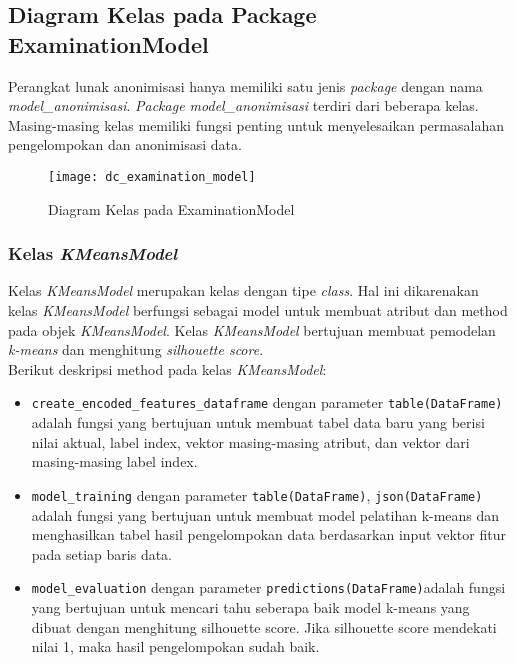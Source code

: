 \subsection{Diagram Kelas pada Package ExaminationModel}

\noindent Perangkat lunak anonimisasi hanya memiliki satu jenis \textit{package} dengan nama \textit{model\_anonimisasi}. \textit{Package model\_anonimisasi} terdiri dari beberapa kelas. Masing-masing kelas memiliki fungsi penting untuk menyelesaikan permasalahan pengelompokan dan anonimisasi data.

\begin{figure}[H]
	\centering
	\texttt{[image: dc\_examination\_model]}
	\caption{Diagram Kelas pada ExaminationModel}
	\label{fig:dc_examination_model}
\end{figure}

\subsubsection{Kelas \textit{KMeansModel}}
Kelas \textit{KMeansModel} merupakan kelas dengan tipe \textit{class}. Hal ini dikarenakan kelas \textit{KMeansModel} berfungsi sebagai model untuk membuat atribut dan method pada objek \textit{KMeansModel}. Kelas \textit{KMeansModel} bertujuan membuat pemodelan \textit{k-means} dan menghitung \textit{silhouette score}.\\

\noindent \noindent Berikut deskripsi method pada kelas \textit{KMeansModel}:

\begin{itemize}

\item \texttt{create\_encoded\_features\_dataframe} dengan parameter \texttt{table(DataFrame)} adalah fungsi yang bertujuan untuk membuat tabel data baru yang berisi nilai aktual, label index, vektor masing-masing atribut, dan vektor dari masing-masing label index.

\item \texttt{model\_training} dengan parameter \texttt{table(DataFrame)}, \texttt{json(DataFrame)} adalah fungsi yang bertujuan untuk membuat model pelatihan k-means dan menghasilkan tabel hasil pengelompokan data berdasarkan input vektor fitur pada setiap baris data.

\item \texttt{model\_evaluation} dengan parameter \texttt{predictions(DataFrame)}adalah fungsi yang bertujuan untuk mencari tahu seberapa baik model k-means yang dibuat dengan menghitung silhouette score. Jika silhouette score mendekati nilai 1, maka hasil pengelompokan sudah baik.

\end{itemize}

